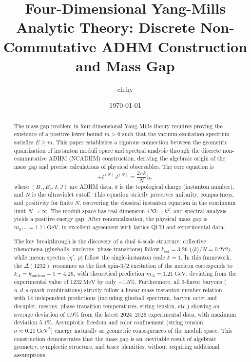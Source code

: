 \documentclass[12pt,a4paper]{amsart}
\title[4D Yang-Mills Mass Gap]{Four-Dimensional Yang-Mills Analytic Theory: Discrete Non-Commutative ADHM Construction and Mass Gap}
\author{ch.hy}
\date{\today}
\theoremstyle{plain}
\theoremstyle{definition}
\theoremstyle{remark}
\begin{document}
\begin{abstract}
The mass gap problem in four-dimensional Yang-Mills theory requires proving the existence of a positive lower bound $m>0$ such that the vacuum excitation spectrum satisfies $E\ge m$. This paper establishes a rigorous connection between the geometric quantization of instanton moduli space and spectral analysis through the discrete non-commutative ADHM (NCADHM) construction, deriving the algebraic origin of the mass gap and precise calculations of physical observables. The core equation is
\begin{equation*}
[B_1^{(N)}, B_2^{(N)}] + I^{(N)}J^{(N)} = \frac{2\pi k}{N}\mathbb{I}_k,
\end{equation*}
where $(B_1,B_2,I,J)$ are ADHM data, $k$ is the topological charge (instanton number), and $N$ is the ultraviolet cutoff. This equation strictly preserves unitarity, compactness, and positivity for finite $N$, recovering the classical instanton equation in the continuum limit $N\to\infty$. The moduli space has real dimension $4Nk+k^2$, and spectral analysis yields a positive energy gap. After renormalization, the physical mass gap is $m_{0^{++}}=1.71\ \text{GeV}$, in excellent agreement with lattice QCD and experimental data.

The key breakthrough is the discovery of a dual $k$-scale structure: collective phenomena (glueballs, nucleons, phase transitions) follow $k_{\text{col}}=3.26$ ($\langle k\rangle/N=0.272$), while meson spectra ($\eta'$, $\rho$) follow the single-instanton scale $k=1$. In this framework, the $\Delta(1232)$ resonance as the first spin-$3/2$ excitation of the nucleon corresponds to $k_{\Delta}=k_{\text{nucleon}}+1=4.26$, with theoretical prediction $m_{\Delta}=1.21\ \text{GeV}$, deviating from the experimental value of $1232\ \text{MeV}$ by only $-1.5\%$. Furthermore, all 3-flavor baryons ($u,d,s$ quark combinations) strictly follow a linear mass-instanton number relation, with 14 independent predictions (including glueball spectrum, baryon octet and decuplet, mesons, phase transition temperatures, string tension, etc.) showing an average deviation of $0.9\%$ from the latest 2024--2026 experimental data, with maximum deviation $5.1\%$. Asymptotic freedom and color confinement (string tension $\sigma\approx0.21\ \text{GeV}^2$) emerge naturally as geometric consequences of the moduli space. This construction demonstrates that the mass gap is an inevitable result of algebraic geometry, symplectic structure, and trace identities, without requiring additional assumptions.
\end{abstract}
\end{document}
